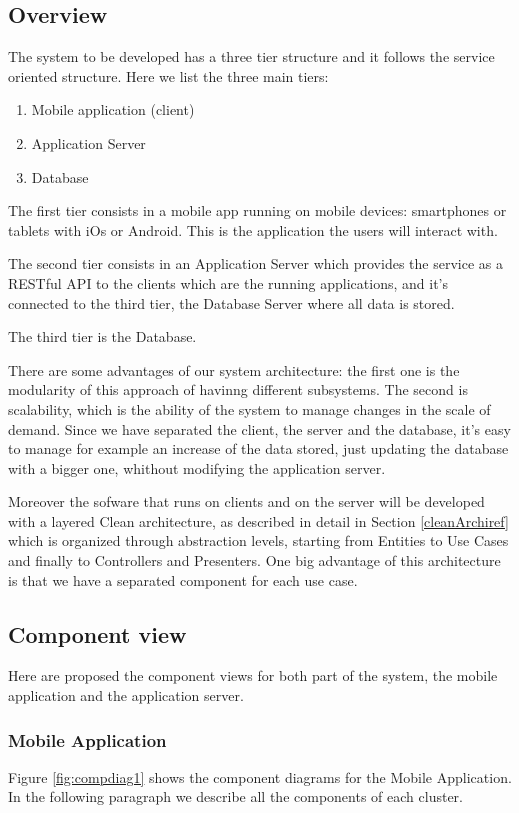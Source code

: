 \subsection{Overview}
The system to be developed has a three tier structure and it follows the service oriented structure.
Here we list the three main tiers:
\begin{enumerate}
  \item Mobile application (client)
  \item Application Server
  \item Database
\end{enumerate}

The first tier consists in a mobile app running on mobile devices: smartphones or tablets with iOs or Android.
This is the application the users will interact with.

The second tier consists in an Application Server which provides the service as a RESTful API to the clients which are the running applications, and it's connected to the third tier, the Database Server where all data is stored.

The third tier is the Database.

There are some advantages of our system architecture: the first one is the modularity of this approach of havinng different subsystems. The second is scalability,  which is the ability of the system to manage changes in the scale of demand. Since we have separated the client, the server and the database, it's easy to manage for example an increase of the data stored, just updating the database with a bigger one, whithout modifying the application server.

Moreover the sofware that runs on clients and on the server will be developed with a layered Clean architecture, as described in detail in Section \ref{cleanArchiref} which is organized through abstraction levels, starting from Entities to Use Cases and finally to Controllers and Presenters.
One big advantage of this architecture is that we have a separated component for each use case.

\subsection{Component view}
Here are proposed the component views for both part of the system, the mobile application and the application server.

\subsubsection{Mobile Application}
Figure \ref{fig:compdiag1} shows the component diagrams for the Mobile Application. In the following paragraph we describe all the components of each cluster.


